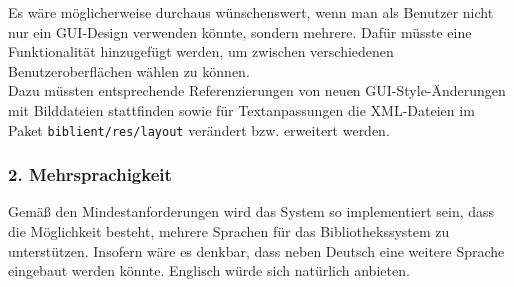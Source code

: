 \documentclass[fontsize=12pt,paper=a4,twoside]{scrartcl}
\begin{document}
Es wäre möglicherweise durchaus wünschenswert, wenn man als Benutzer nicht nur ein GUI-Design verwenden könnte, sondern mehrere. Dafür müsste eine Funktionalität hinzugefügt werden, um zwischen verschiedenen Benutzeroberflächen wählen zu können. \\
Dazu müssten entsprechende Referenzierungen von neuen GUI-Style-Änderungen mit Bilddateien stattfinden sowie für Textanpassungen die XML-Dateien im Paket \texttt{biblient/res/layout} verändert bzw. erweitert werden. 

\subsubsection*{2. Mehrsprachigkeit}

Gemäß den Mindestanforderungen wird das System so implementiert sein, dass die Möglichkeit besteht, mehrere Sprachen für das Bibliothekssystem zu unterstützen. Insofern wäre es denkbar, dass neben Deutsch eine weitere Sprache eingebaut werden könnte. Englisch würde sich natürlich anbieten.
\end{document}
